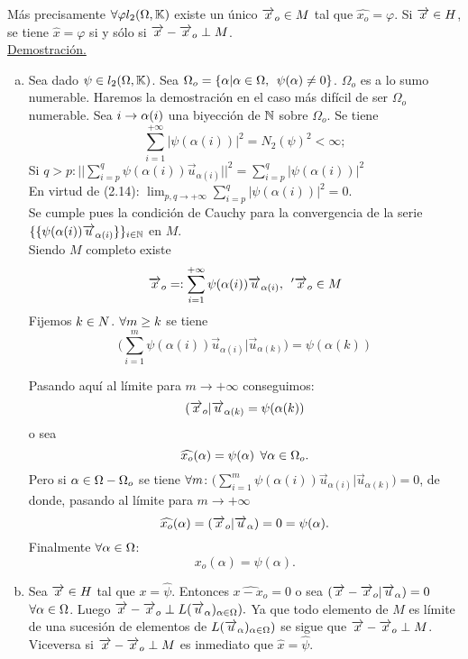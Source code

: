 Más precisamente $\forall \varphi l_2 (\Omega,\mathbb{K})$ existe un único $\overrightarrow{x}_o \in M$ tal que $\widehat{x_o}=\varphi$. Si $\overrightarrow{x} \in H$, se tiene $\widehat{x}=\varphi$ si y sólo si $\overrightarrow{x} -\overrightarrow{x}_o \perp M$.\\
\underline{Demostración.} \\
\begin{enumerate}[a)]
\item Sea dado $\psi \in l_2 (\Omega ,\mathbb{K})$. Sea $\Omega_o = \lbrace \alpha | \alpha \in \Omega, \phantom{s} \psi (\alpha) \neq 0 \rbrace$. $\Omega_o$ es a lo sumo numerable. Haremos la demostración en el caso más difícil de ser $\Omega_o$ numerable. Sea $i \rightarrow \alpha (i)$ una biyección de $\mathbb{N}$ sobre $\Omega_o$. Se tiene
\begin{equation}
\sum_{i=1}^{+\infty}| \psi (\alpha (i))|^2=N_2(\psi )^2 < \infty;
\end{equation}
Si $q>p: || \sum_{i=p}^q \psi (\alpha (i)) \overrightarrow{u}_{\alpha (i)}||^2=\sum_{i=p}^q | \psi (\alpha (i)) |^2$ \\
En virtud de (2.14): $\lim_{p,q \to +\infty} \sum_{i=p}^q | \psi (\alpha (i))|^2=0$.\\
Se cumple pues la condición de Cauchy para la convergencia de la serie $ \lbrace \lbrace \psi (\alpha (i)) \overrightarrow{u}_{\alpha (i)} \rbrace \rbrace_{i \in \mathbb{N}}$ en $M$. \\
Siendo $M$ completo existe \\
$$
\overrightarrow{x}_o =: \sum_{i=1}^{+\infty} \psi (\alpha (i)) \overrightarrow{u}_{\alpha (i)}, \phantom{s} '\overrightarrow{x}_o \in M
$$
Fijemos $k \in N$. $\forall m \geq k$ se tiene 
$$
\biggl( \sum_{i=1}^m \psi(\alpha (i)) \overrightarrow{u}_{\alpha (i)} | \overrightarrow{u}_{\alpha (k)} \biggl)= \psi (\alpha (k))
$$
 
 
 Pasando aquí al límite para $m \to +\infty$ conseguimos:
 $$
 (\overrightarrow{x}_o | \overrightarrow{u}_{\alpha (k)}=\psi (\alpha (k))
 $$
o sea \\
$$
\widehat{x_o}(\alpha )= \psi (\alpha) \phantom{s} \forall \alpha \in \Omega_o.
$$ 
Pero si $\alpha \in \Omega - \Omega_o$ se tiene $\forall m$: 
$\biggl( \sum_{i=1}^m \psi(\alpha (i)) \overrightarrow{u}_{\alpha (i)} | \overrightarrow{u}_{\alpha (k)} \biggl)=0 $, de donde, pasando al límite para $m \to +\infty$
$$
\widehat{x_o}(\alpha)= (\overrightarrow{x}_o | \overrightarrow{u}_\alpha )=0=\psi (\alpha).
$$
 Finalmente $\forall \alpha \in \Omega$: 
 $$
 x_o (\alpha )= \psi (\alpha).
 $$
 \item  Sea $\overrightarrow{x} \in H$ tal que $x=\widehat{\psi}$. Entonces $\widehat{x-x_o}=0$ o sea $(\overrightarrow{x}-\overrightarrow{x}_o |\overrightarrow{u}_{\alpha})=0$ $\forall \alpha \in \Omega$. Luego $\overrightarrow{x}-\overrightarrow{x}_o \perp L (\overrightarrow{u}_{\alpha})_{\alpha \in \Omega}).$  Ya que todo elemento de $M$ es límite de una sucesión de elementos de $L (\overrightarrow{u}_{\alpha})_{\alpha \in \Omega})$ se sigue que $\overrightarrow{x}-\overrightarrow{x}_o \perp M$. Viceversa si  $\overrightarrow{x}-\overrightarrow{x}_o \perp M$ es inmediato que $\widehat{x}=\widehat{\psi}$. \\
  
 \end{enumerate}

